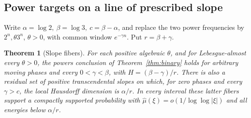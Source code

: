 \documentclass[11pt,a4paper,reqno]{amsart}
\newtheorem{theorem}{Theorem}[section]
\theoremstyle{definition}
\theoremstyle{remark}
\numberwithin{equation}{section}
\begin{document}
\subsection{Power targets on a line of prescribed slope}
Write \(\alpha=\log2,\ \beta=\log3,\ c=\beta-\alpha\), and replace
the two power frequencies by \(2^n,\theta3^n\), \(\theta>0\), with
common window \(e^{-\gamma n}\). Put \(r=\beta+\gamma\).
\begin{theorem}[Slope fibers]\label{thm:slopes}
For each positive algebraic \(\theta\), and for Lebesgue-almost
every \(\theta>0\), the powers conclusion of
Theorem~\ref{thm:binary} holds for arbitrary moving phases and
every \(0<\gamma<\beta\), with \(H=(\beta-\gamma)/r\).
There is also a residual set of positive transcendental slopes on
which, for zero phases and every \(\gamma>c\), the local Hausdorff
dimension is \(\alpha/r\). In every interval these latter fibers
support a compactly supported probability with
\(\widehat\mu(\xi)=o(1/\log\log|\xi|)\) and all energies below
\(\alpha/r\).
\end{theorem}
\end{document}
